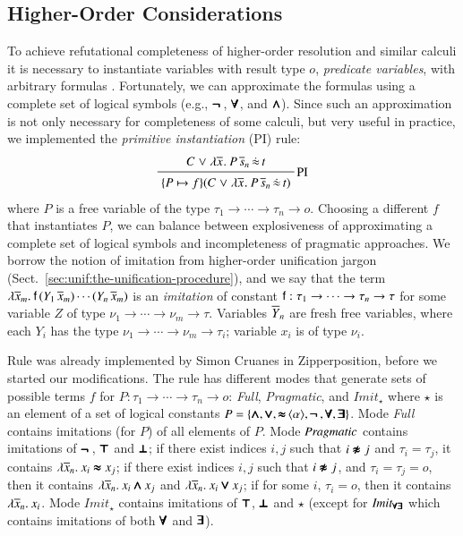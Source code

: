 \subsection{Higher-Order Considerations}
\label{subsect:bool:core}
To achieve refutational completeness of higher-order resolution and similar
calculi it is necessary to instantiate variables with result type $o$,
\emph{predicate variables}, with arbitrary formulas
\cite{as-18-phd,pa-01-classical-ty-thy}. Fortunately, we can approximate the
formulas using a complete set of logical symbols (e.g., $\pmb{\neg\,}$, $\pmb{\forall}$, and
$\pmb{\land}$). Since such an approximation is not only necessary for completeness of
some calculi, but very useful in practice, we implemented the \emph{primitive
instantiation} (PI) rule:
%
$$ \namedinference{PI} {C \llor \lam{\tuple{x}{}}{P \, \tuplen{s}} \, \dot{\eq}
\, t} {\substcl{\{ P
\mapsto f \}}{C \llor \lam{\tuple{x}{}}{P \, \tuplen{s}} \, \dot{\eq} \, t}  } $$
%
where $P$ is a free variable of
the type $\tau_1 \rightarrow \cdots \rightarrow \tau_n \rightarrow o$. 
Choosing a different $f$ that instantiates $P$, we can balance between
explosiveness of approximating a complete set of logical symbols and
incompleteness of pragmatic approaches. We borrow the notion of imitation from
higher-order unification jargon (Sect.~\ref{sec:unif:the-unification-procedure}), and we say
that the term $\lambda \overline{x}_{m}.\> \mathsf{f} \, (Y_1 \, \overline{x}_{m}) \cdots (Y_n
\, \overline{x}_{m}) $ is an \emph{imitation} of constant $\mathsf{f} : \tau_1
\rightarrow \cdots \rightarrow \tau_n \rightarrow \tau$ for some variable $Z$ of type $\nu_1
\rightarrow \cdots \rightarrow \nu_m \rightarrow \tau$. Variables $\overline{Y}_{n}$
are fresh free variables, where each $Y_i$ has the type $\nu_1 \rightarrow
\cdots \rightarrow \nu_m \rightarrow \tau_i$; variable $x_i$ is of type $\nu_i$.
\pagebreak[2]

Rule  was already implemented by Simon Cruanes in Zipperposition,
before we started our modifications. The rule has different modes that generate
sets of possible terms $f$ for $P: \tau_1 \rightarrow \cdots \rightarrow \tau_n
\rightarrow o$: \emph{Full}, \emph{Pragmatic}, and $\mathit{Imit}_{\star}$ where
$\star$ is an element of a set of logical constants $P = \{ \pmb{\land}, \pmb{\lor},
\mathop{\pmb{\approx}}{\langle\alpha\rangle}, \pmb{\neg\,}, \pmb{\forall}, \pmb{\exists} \}$. Mode \emph{Full}
contains imitations (for $P$) of all elements of $P$. Mode $\emph{Pragmatic}$
contains imitations of $\pmb{\neg\,}$, $\pmb{\top}$ and $\pmb{\bot}$; if there exist indices $i,j$
such that $i\pmb{\not\approx} j$ and  $\tau_i = \tau_j$, it contains $\lambda \overline{x}_{n}.\> x_i
\pmb{\approx} x_j$; if there exist indices $i,j$ such that $i \pmb{\not\approx} j$, and $\tau_i =
\tau_j = o$, then it contains $\lambda \overline{x}_{n}.\> x_i \pmb{\land} x_j$ and
$\lambda \overline{x}_{n}.\> x_i \pmb{\lor} x_j$; if for some $i$, $\tau_i = o$, then it
contains $\lambda \overline{x}_{n}.\> x_i$. Mode $\mathit{Imit}_\star$ contains
imitations of $\pmb{\top}$, $\pmb{\bot}$ and $\star$ (except for $\mathit{Imit_{\pmb{\forall}\pmb{\exists}}}$ which contains imitations
of both $\pmb{\forall}$ and $\pmb{\exists}$).


